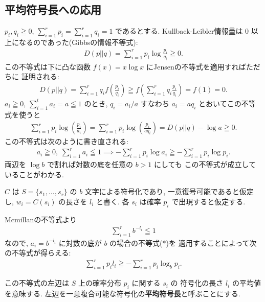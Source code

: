 \documentclass[12pt,twoside]{jarticle}
\theoremstyle{jplain}
\theoremstyle{jplain}
\theoremstyle{jplain}
\numberwithin{theorem}{section}
\numberwithin{equation}{section}
\numberwithin{figure}{section}
\numberwithin{table}{section}
\begin{document}

\subsection{平均符号長への応用}
\label{sec:average-code-length}

$p_i,q_i\geqq 0$, $\sum_{i=1}^r p_i=\sum_{i=1}^r q_i=1$ であるとする.
Kullback-Leibler情報量は $0$ 以上になるのであった(Gibbsの情報不等式):
\begin{align*}
D(p||q)=\sum_{i=1}^r p_i\log\frac{p_i}{q_i}\geqq 0.
\end{align*}
この不等式は下に凸な函数 $f(x)=x\log x$ にJensenの不等式を適用すればただちに
証明される:
\begin{align*}
D(p||q)
=\sum_{i=1}^r q_i f\left(\frac{p_i}{q_i}\right)
\geqq f\left(\sum_{i=1}^r q_i\frac{p_i}{q_i}\right)
=f(1)=0.
\end{align*}
$a_i\geqq 0$, $\sum_{i=1}^t a_i=a\leqq 1$ のとき,
$q_i=a_i/a$ すなわち $a_i=a q_i$ とおいてこの不等式を使うと
\begin{align*}
\sum_{i=1}^r p_i\log\left(\frac{p_i}{a_i}\right)
=\sum_{i=1}^r p_i\log\left(\frac{p_i}{a q_i}\right)
=D(p||q)-\log a
\geqq 0.
\end{align*}
この不等式は次のように書き直される:
\begin{align*}
a_i\geqq 0,\; \sum_{i=1}^r a_i\leqq 1 \implies
-\sum_{i=1}^r p_i\log a_i \geqq -\sum_{i=1}^r p_i \log p_i.
\tag{$*$}
\end{align*}
両辺を $\log b$ で割れば対数の底を任意の $b>1$ にしても
この不等式が成立していることがわかる.

$C$ は $S=\{s_1,\ldots,s_r\}$ の $b$ 文字による符号化であり,
一意復号可能であると仮定し, $w_i=C(s_i)$ の長さを $l_i$ と書く.
各 $s_i$ は確率 $p_i$ で出現すると仮定する.

Mcmillanの不等式より
\begin{align*}
\sum_{i=1}^r b^{-l_i}\leqq 1
\end{align*}
なので, $a_i=b^{-l_i}$ に対数の底が $b$ の場合の不等式($*$)を
適用することによって次の不等式が得らえる:
\begin{align*}
\sum_{i=1}^r p_i l_i \geqq -\sum_{i=1}^r p_i \log_b p_i.
\end{align*}

この不等式の左辺は $S$ 上の確率分布 $p_i$ に関する $s_i$ の
符号化の長さ $l_i$ の平均値を意味する.
左辺を一意複合可能な符号化の{\bfseries 平均符号長}と呼ぶことにする.
\end{document}
